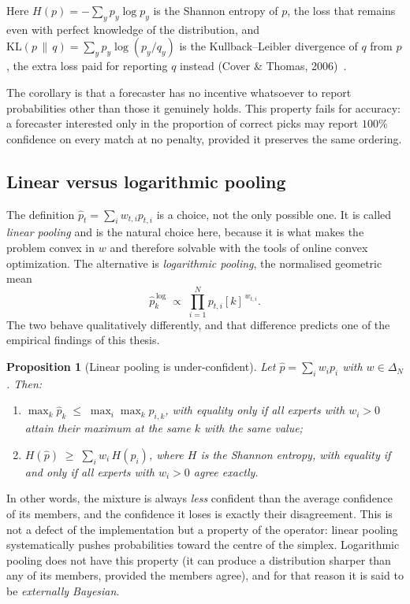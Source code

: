 \documentclass[12pt,a4paper,oneside]{report}
\renewcommand{\_}{\oldunderscore\allowbreak}
\theoremstyle{definition}
\theoremstyle{plain}
\newtheorem{proposition}[theorem]{Proposition}
\theoremstyle{definition}   %
\begin{document}
Here $H(p) = -\sum_y p_y \log p_y$ is the Shannon entropy of $p$, the loss that remains even with
perfect knowledge of the distribution, and $\mathrm{KL}(p\,\|\,q) = \sum_y p_y \log(p_y/q_y)$ is
the Kullback--Leibler divergence of $q$ from $p$, the extra loss paid for reporting $q$ instead
(Cover \& Thomas, 2006)~\cite{coverthomas2006}.

The corollary is that a forecaster has no incentive whatsoever to report probabilities other
than those it genuinely holds. This property fails for accuracy: a forecaster interested only
in the proportion of correct picks may report $100\%$ confidence on every match at no penalty,
provided it preserves the same ordering.

\subsection*{Linear versus logarithmic pooling}
\label{sec:pooling}

The definition $\hat{p}_t = \sum_i w_{t,i} p_{t,i}$ is a choice, not the only possible one. It
is called \emph{linear pooling} and is the natural choice here, because it is what makes the
problem convex in $w$ and therefore solvable with the tools of online convex optimization. The
alternative is \emph{logarithmic pooling}, the normalised geometric mean
\[
\hat{p}^{\,\mathrm{log}}_k \;\propto\; \prod_{i=1}^{N} p_{t,i}[k]^{\,w_{t,i}} .
\]
The two behave qualitatively differently, and that difference predicts one of the empirical
findings of this thesis.

\begin{proposition}[Linear pooling is under-confident]
\label{prop:pooling-shrinks}
Let $\hat{p} = \sum_i w_i p_i$ with $w \in \Delta_N$. Then:
\begin{enumerate}[label=(\alph*),topsep=3pt]
  \item $\max_k \hat{p}_k \;\leq\; \max_i \max_k p_{i,k}$, with equality only if all experts
        with $w_i>0$ attain their maximum at the same $k$ with the same value;
  \item $H(\hat{p}) \;\geq\; \sum_i w_i\, H(p_i)$, where $H$ is the Shannon entropy, with
        equality if and only if all experts with $w_i>0$ agree exactly.
\end{enumerate}
\end{proposition}

In other words, the mixture is always \emph{less} confident than the average confidence of its
members, and the confidence it loses is exactly their disagreement. This is not a defect of the
implementation but a property of the operator: linear pooling systematically pushes
probabilities toward the centre of the simplex. Logarithmic pooling does not have this
property (it can produce a distribution sharper than any of its members, provided the members
agree), and for that reason it is said to be \emph{externally Bayesian}.
\end{document}
